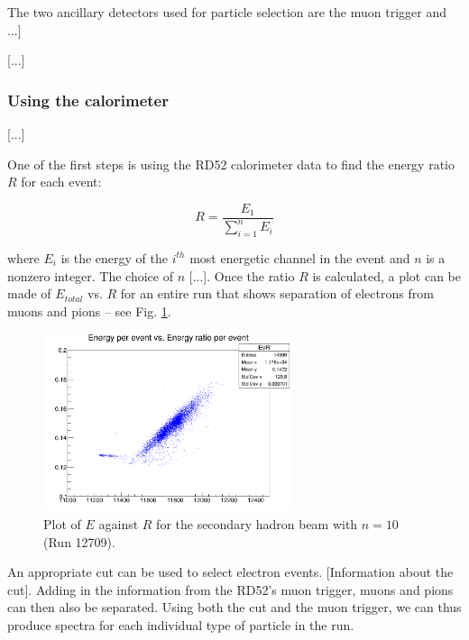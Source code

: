 The two ancillary detectors used for particle selection are the muon trigger and ...]

[...]

\subsubsection{Using the calorimeter}
[...]

One of the first steps is using the RD52 calorimeter data to find the energy ratio $R$ for each event:

\begin{displaymath}
	R = \frac{E_1}{\sum_{i=1}^{n} E_i}
\end{displaymath}

where $E_i$ is the energy of the $i^{th}$ most energetic channel in the event and $n$ is a nonzero integer. The choice of $n$ [...]. Once the ratio $R$ is calculated, a plot can be made of $E_{total}$ vs. $R$ for an entire run that shows separation of electrons from muons and pions -- see Fig. \ref{figure:testbeam/results/EvR}.


\begin{figure}[h]
	\centering
	\includegraphics[width=0.65\textwidth]{../Pictures/12709-EvR.png}
	\caption{Plot of $E$ against $R$ for the secondary hadron beam with $n = 10$ (Run 12709).}
	\label{figure:testbeam/results/EvR}
\end{figure}

An appropriate cut can be used to select electron events. [Information about the cut]. Adding in the information from the RD52's muon trigger, muons and pions can then also be separated. Using both the cut and the muon trigger, we can thus produce spectra for each individual type of particle in the run.

